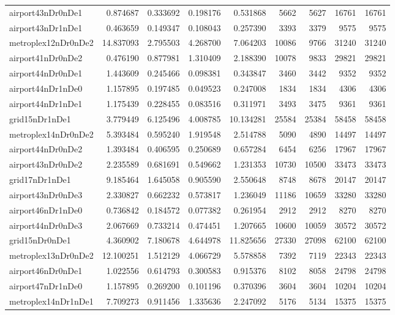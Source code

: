 \begin{longtable}{|l|r|r|r|r|r|r|r|r|}
airport43nDr0nDe1 & 0.874687 & 0.333692 & 0.198176 & 0.531868 & 5662 & 5627 & 16761 & 16761 \\
airport43nDr1nDe1 & 0.463659 & 0.149347 & 0.108043 & 0.257390 & 3393 & 3379 & 9575 & 9575 \\
metroplex12nDr0nDe2 & 14.837093 & 2.795503 & 4.268700 & 7.064203 & 10086 & 9766 & 31240 & 31240 \\
airport41nDr0nDe2 & 0.476190 & 0.877981 & 1.310409 & 2.188390 & 10078 & 9833 & 29821 & 29821 \\
airport44nDr0nDe1 & 1.443609 & 0.245466 & 0.098381 & 0.343847 & 3460 & 3442 & 9352 & 9352 \\
airport44nDr1nDe0 & 1.157895 & 0.197485 & 0.049523 & 0.247008 & 1834 & 1834 & 4306 & 4306 \\
airport44nDr1nDe1 & 1.175439 & 0.228455 & 0.083516 & 0.311971 & 3493 & 3475 & 9361 & 9361 \\
grid15nDr1nDe1 & 3.779449 & 6.125496 & 4.008785 & 10.134281 & 25584 & 25384 & 58458 & 58458 \\
metroplex14nDr0nDe2 & 5.393484 & 0.595240 & 1.919548 & 2.514788 & 5090 & 4890 & 14497 & 14497 \\
airport44nDr0nDe2 & 1.393484 & 0.406595 & 0.250689 & 0.657284 & 6454 & 6256 & 17967 & 17967 \\
airport43nDr0nDe2 & 2.235589 & 0.681691 & 0.549662 & 1.231353 & 10730 & 10500 & 33473 & 33473 \\
grid17nDr1nDe1 & 9.185464 & 1.645058 & 0.905590 & 2.550648 & 8748 & 8678 & 20147 & 20147 \\
airport43nDr0nDe3 & 2.330827 & 0.662232 & 0.573817 & 1.236049 & 11186 & 10659 & 33280 & 33280 \\
airport46nDr1nDe0 & 0.736842 & 0.184572 & 0.077382 & 0.261954 & 2912 & 2912 & 8270 & 8270 \\
airport44nDr0nDe3 & 2.067669 & 0.733214 & 0.474451 & 1.207665 & 10600 & 10059 & 30572 & 30572 \\
grid15nDr0nDe1 & 4.360902 & 7.180678 & 4.644978 & 11.825656 & 27330 & 27098 & 62100 & 62100 \\
metroplex13nDr0nDe2 & 12.100251 & 1.512129 & 4.066729 & 5.578858 & 7392 & 7119 & 22343 & 22343 \\
airport46nDr0nDe1 & 1.022556 & 0.614793 & 0.300583 & 0.915376 & 8102 & 8058 & 24798 & 24798 \\
airport47nDr1nDe0 & 1.157895 & 0.269200 & 0.101196 & 0.370396 & 3604 & 3604 & 10204 & 10204 \\
metroplex14nDr1nDe1 & 7.709273 & 0.911456 & 1.335636 & 2.247092 & 5176 & 5134 & 15375 & 15375 \\

\end{longtable}
